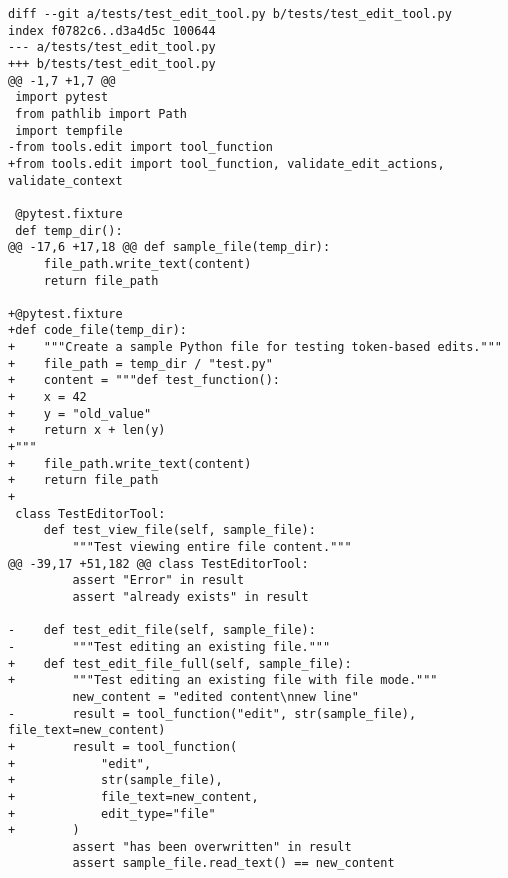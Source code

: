 \begin{lstlisting}[style=diffstyle]
diff --git a/tests/test_edit_tool.py b/tests/test_edit_tool.py
index f0782c6..d3a4d5c 100644
--- a/tests/test_edit_tool.py
+++ b/tests/test_edit_tool.py
@@ -1,7 +1,7 @@
 import pytest
 from pathlib import Path
 import tempfile
-from tools.edit import tool_function
+from tools.edit import tool_function, validate_edit_actions, validate_context
 
 @pytest.fixture
 def temp_dir():
@@ -17,6 +17,18 @@ def sample_file(temp_dir):
     file_path.write_text(content)
     return file_path
 
+@pytest.fixture
+def code_file(temp_dir):
+    """Create a sample Python file for testing token-based edits."""
+    file_path = temp_dir / "test.py"
+    content = """def test_function():
+    x = 42
+    y = "old_value"
+    return x + len(y)
+"""
+    file_path.write_text(content)
+    return file_path
+
 class TestEditorTool:
     def test_view_file(self, sample_file):
         """Test viewing entire file content."""
@@ -39,17 +51,182 @@ class TestEditorTool:
         assert "Error" in result
         assert "already exists" in result
 
-    def test_edit_file(self, sample_file):
-        """Test editing an existing file."""
+    def test_edit_file_full(self, sample_file):
+        """Test editing an existing file with file mode."""
         new_content = "edited content\nnew line"
-        result = tool_function("edit", str(sample_file), file_text=new_content)
+        result = tool_function(
+            "edit", 
+            str(sample_file), 
+            file_text=new_content, 
+            edit_type="file"
+        )
         assert "has been overwritten" in result
         assert sample_file.read_text() == new_content
 

\end{lstlisting}
